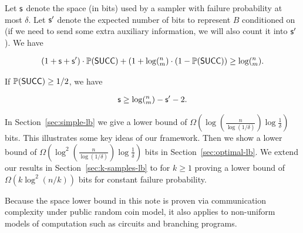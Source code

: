 \begin{lemma} \label{lemma:lb-meta}
  Let $\textsf{s}$ denote the space (in bits) used by a sampler with failure probability at most $\delta$. Let $\textsf{s}'$ denote the expected number of bits to represent $B$ conditioned on \success (if we need to send some extra auxiliary information, we will also count it into $\textsf{s}'$). We have 
  
  \begin{align}
  (1+\textsf{s}+\textsf{s}')\cdot \operatorname*{\mathbb{P}}(\textsf{SUCC})+(1+\log(^n_m) \cdot (1-\operatorname*{\mathbb{P}}(\textsf{SUCC})) \ge \log (^n_m).
  \end{align} 
  
  If $\operatorname*{\mathbb{P}}(\textsf{SUCC})\ge 1/2$, we have 
  
  \begin{align} \label{eqn:lb-meta}
  \textsf{s}\ge \log (^n_m) - \textsf{s}' - 2.
  \end{align} 
\end{lemma}


In Section~\ref{sec:simple-lb} we give a lower bound of $\Omega(\log(\frac n{\log(1/\delta)}) \log \frac{1}{\delta})$ bits. This illustrates some key ideas of our framework. Then we show a lower bound of $\Omega(\log^2(\frac n{\log(1/\delta)}) \log \frac{1}{\delta})$ bits in Section~\ref{sec:optimal-lb}.
We extend our results in Section~\ref{sec:k-samples-lb} to  for $k\ge 1$ proving a lower bound of $\Omega(k\log^2(n/k))$ bits for constant failure probability.

\begin{remark}
  Because the space lower bound in this note is proven via communication complexity under public random coin model, it also applies to non-uniform models of computation such as circuits and branching programs.  
\end{remark}